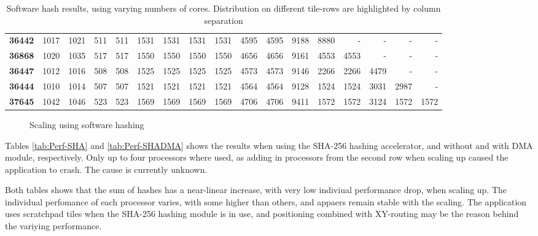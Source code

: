\begin{flushleft}
\begin{table}
\begin{tabular}{| l || r r r r | r r r r | r r r | r r r r r |}
  \textbf{36442} & 1017 & 1021 & 511 & 511 & 1531 & 1531 & 1531 & 1531 & 4595 & 4595 & 9188 & 8880 & - & - & - & -\\
  \textbf{36868} & 1020 & 1035 & 517 & 517 & 1550 & 1550 & 1550 & 1550 & 4656 & 4656 & 9161 & 4553 & 4553 & - & - & -\\
  \textbf{36447} & 1012 & 1016 & 508 & 508 & 1525 & 1525 & 1525 & 1525 & 4573 & 4573 & 9146 & 2266 & 2266 & 4479 & - & -\\
  \textbf{36444} & 1010 & 1014 & 507 & 507 & 1521 & 1521 & 1521 & 1521 & 4564 & 4564 & 9128 & 1524 & 1524 & 3031 & 2987 & -\\
  \textbf{37645} & 1042 & 1046 & 523 & 523 & 1569 & 1569 & 1569 & 1569 & 4706 & 4706 & 9411 & 1572 & 1572 & 3124 & 1572 & 1572\\
  \hline  
\end{tabular}
\caption{Software hash results, using varying numbers of cores. Distribution on different tile-rows are highlighted by column separation}
\label{tab:Perf-SW}
\end{table}
\end{flushleft}

\begin{figure}
	\caption{Scaling using software hashing}
	\label{fig:sw-scaling}
\end{figure}

Tables \ref{tab:Perf-SHA} and \ref{tab:Perf-SHADMA} shows the results when using the SHA-256 hashing accelerator, and without and with DMA module, respectively.
Only up to four processors where used, as adding in processors from the second row when scaling up caused the application to crash.
The cause is currently unknown.

Both tables shows that the sum of hashes has a near-linear increase, with very low indiviual performance drop, when scaling up.
The individual perfomance of each processor varies, with some higher than others, and appaers remain stable with the scaling. 
The application uses scratchpad tiles when the SHA-256 hashing module is in use, and positioning combined with XY-routing may be the reason behind the variying performance.

